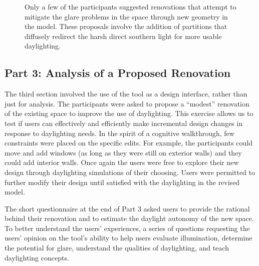 \documentclass[review]{vgtc}                 %
\begin{document}
\begin{figure}[t]
\caption{Only a few of the participants suggested renovations that
  attempt to mitigate the glare problems in the space through new
  geometry in the model.  These proposals involve the addition of
  partitions that diffusely redirect the harsh direct southern light
  for more usable daylighting.
%
}
\label{figure:diffusing_renovations}
\vspace{-0.1in}
\end{figure}



\subsection{Part 3: Analysis of a Proposed Renovation}

The third section involved the use of the tool as a design interface,
rather than just for analysis.  The participants were asked to propose
a ``modest'' renovation of the existing space to improve the use of
daylighting.  This exercise allows us to test if users can effectively
and efficiently make incremental design changes in response to
daylighting needs.  In the spirit of a cognitive walkthrough, few
constraints were placed on the specific edits.  For example, the
participants could move and add windows (as long as they were still on
exterior walls) and they could add interior walls.  Once again the
users were free to explore their new design through daylighting
simulations of their choosing.  Users were permitted to further modify
their design until satisfied with the daylighting in the revised
model.

The short questionnaire at the end of Part 3 asked users to provide
the rational behind their renovation and to estimate the daylight
autonomy of the new space.  To better understand the users' experiences,
a series of questions requesting the users' opinion on the tool's
ability to help users evaluate illumination, determine the potential
for glare, understand the qualities of daylighting, and teach
daylighting concepts.
\end{document}
